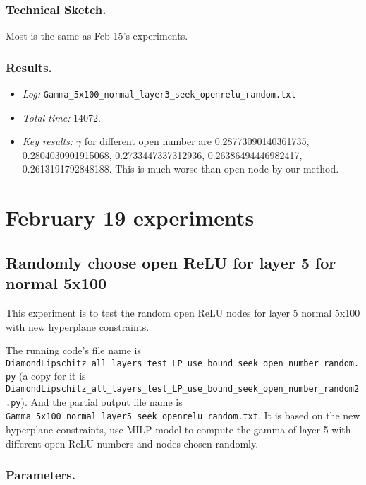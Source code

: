 \documentclass{llncs}
\begin{document}
\subsubsection*{Technical Sketch.}

Most is the same as Feb 15's experiments.

\subsubsection*{Results.}

\begin{itemize}
	\item \emph{Log:} \verb*|Gamma_5x100_normal_layer3_seek_openrelu_random.txt|
	
	\item \emph{Total time:} 14072.
	
	\item \emph{Key results:} $\gamma$ for different open number are 0.28773090140361735,
	0.2804030901915068,
	0.2733447337312936,
	0.26386494446982417,
	0.2613191792848188. This is much worse than open node by our method.

\end{itemize}

\section{February 19 experiments}

\subsection{Randomly choose open ReLU for layer 5 for normal 5x100}

This experiment is to test the random open ReLU nodes for layer 5 normal 5x100 with new hyperplane constraints.

\vspace*{1ex}

The running code's file name is \verb*|DiamondLipschitz_all_layers_test_LP_use_bound_seek_open_number_random.py| (a copy for it is \verb*|DiamondLipschitz_all_layers_test_LP_use_bound_seek_open_number_random2.py|). And the partial output file name is \verb*|Gamma_5x100_normal_layer5_seek_openrelu_random.txt|.  It is based on the new hyperplane constraints, use MILP model to compute the gamma of layer 5 with different open ReLU numbers and nodes chosen randomly.

\subsubsection*{Parameters.}
\end{document}
